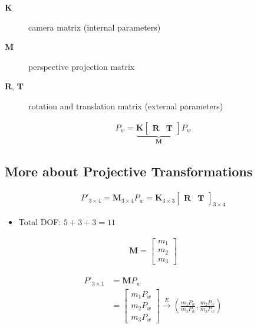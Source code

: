 \documentclass[letterpaper,12pt]{article}
\newcommand{\vect}[1]{\mathbf{#1}}
\newcommand{\matr}[1]{\mathbf{#1}}
\begin{document}
\begin{description}
 \item[$\matr{K}$] camera matrix (internal parameters)
 \item[$\matr{M}$] perspective projection matrix
 \item[$\matr{R}$, $\matr{T}$] rotation and translation matrix (external parameters)
\end{description}

\begin{align}
 P_w = \underbrace{\matr{K} \begin{bmatrix}
   \matr{R} & \vect{T}
  \end{bmatrix}}_\matr{M}
 P_w
\end{align}

\subsection{More about Projective Transformations}
\begin{align}
 P'_{3 \times 4} = \matr{M}_{3 \times 4} P_w = \matr{K}_{3 \times 3} \begin{bmatrix}
  \matr{R} & \vect{T}
 \end{bmatrix}_{3 \times 4}
\end{align}
\begin{itemize}
 \item Total DOF: $5 + 3 + 3 = 11$ 
\end{itemize}

\begin{align}
 \matr{M} = \begin{bmatrix}
  m_1 \\
  m_2 \\
  m_3
 \end{bmatrix}
\end{align}

\begin{align}
 P'_{3 \times 1} & = \matr{M} P_w                \\
                 & = \begin{bmatrix}
  m_1 P_w \\
  m_2 P_w \\
  m_3 P_w
 \end{bmatrix}
 \xrightarrow{E} (\frac{m_1 P_w}{m_3 P_w}, \frac{m_2 P_w}{m_3 P_w})
\end{align}
\end{document}
